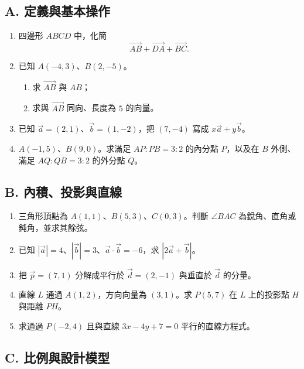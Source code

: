 \documentclass[11pt,a4paper]{article}
\providecommand{\tightlist}{%
  \setlength{\itemsep}{0pt}\setlength{\parskip}{0pt}}
\begin{document}
\subsection{A. 定義與基本操作}\label{a.-ux5b9aux7fa9ux8207ux57faux672cux64cdux4f5c}

\begin{enumerate}
\def\labelenumi{\arabic{enumi}.}
\item
  四邊形 \(ABCD\) 中，化簡
  \[
  \overrightarrow{AB}+\overrightarrow{DA}+\overrightarrow{BC}.
  \]
\item
  已知 \(A(-4,3)\)、\(B(2,-5)\)。

  \begin{enumerate}
  \def\labelenumii{\arabic{enumii}.}
  \tightlist
  \item
    求 \(\overrightarrow{AB}\) 與 \(AB\)；
  \item
    求與 \(\overrightarrow{AB}\) 同向、長度為 \(5\) 的向量。
  \end{enumerate}
\item
  已知 \(\vec a=(2,1)\)、\(\vec b=(1,-2)\)，把 \((7,-4)\) 寫成 \(x\vec a+y\vec b\)。
\item
  \(A(-1,5)\)、\(B(9,0)\)。求滿足 \(AP:PB=3:2\) 的內分點 \(P\)，以及在 \(B\) 外側、滿足 \(AQ:QB=3:2\) 的外分點 \(Q\)。
\end{enumerate}

\subsection{B. 內積、投影與直線}\label{b.-ux5167ux7a4dux6295ux5f71ux8207ux76f4ux7dda}

\begin{enumerate}
\def\labelenumi{\arabic{enumi}.}
\setcounter{enumi}{4}
\item
  三角形頂點為 \(A(1,1)\)、\(B(5,3)\)、\(C(0,3)\)。判斷 \(\angle BAC\) 為銳角、直角或鈍角，並求其餘弦。
\item
  已知 \(|\vec a|=4\)、\(|\vec b|=3\)、\(\vec a\cdot\vec b=-6\)，求 \(|2\vec a+\vec b|\)。
\item
  把 \(\vec p=(7,1)\) 分解成平行於 \(\vec d=(2,-1)\) 與垂直於 \(\vec d\) 的分量。
\item
  直線 \(L\) 通過 \(A(1,2)\)，方向向量為 \((3,1)\)。求 \(P(5,7)\) 在 \(L\) 上的投影點 \(H\) 與距離 \(PH\)。
\item
  求通過 \(P(-2,4)\) 且與直線 \(3x-4y+7=0\) 平行的直線方程式。
\end{enumerate}

\subsection{C. 比例與設計模型}\label{c.-ux6bd4ux4f8bux8207ux8a2dux8a08ux6a21ux578b}
\end{document}
